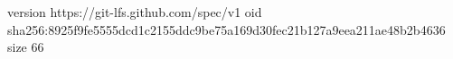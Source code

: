 version https://git-lfs.github.com/spec/v1
oid sha256:8925f9fe5555dcd1c2155ddc9be75a169d30fec21b127a9eea211ae48b2b4636
size 66
